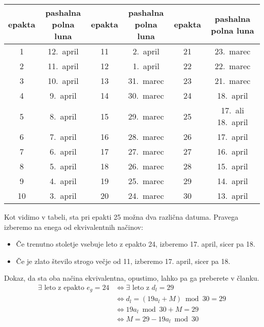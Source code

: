 \documentclass[a4paper,12pt]{article}
\begin{document}
\begin{center}
    \begin{tabular}{| c c | c c | c c |}
        \hline
        epakta & \makecell{pashalna \\ polna luna} & epakta & \makecell{pashalna \\ polna luna} & epakta & \makecell{pashalna \\ polna luna} \\ \hline
        1 & 12.\ april & 11 & 2.\ april & 21 & 23.\ marec \\  
        2 & 11.\ april & 12 & 1.\ april & 22 & 22.\ marec \\
        3 & 10.\ april & 13 & 31.\ marec & 23 & 21.\ marec \\
        4 & 9.\ april & 14 & 30.\ marec & 24 & 18.\ april \\
        5 & 8.\ april & 15 & 29.\ marec & 25 & 17.\ ali 18.\ april \\
        6 & 7.\ april & 16 & 28.\ marec & 26 & 17.\ april \\
        7 & 6.\ april & 17 & 27.\ marec & 27 & 16.\ april \\
        8 & 5.\ april & 18 & 26.\ marec & 28 & 15.\ april \\
        9 & 4.\ april & 19 & 25.\ marec & 29 & 14.\ april \\
        10 & 3.\ april & 20 & 24.\ marec & 30 & 13.\ april \\ \hline
    \end{tabular}
\end{center} %

Kot vidimo v tabeli, sta pri epakti 25 možna dva različna datuma. 
Pravega izberemo na enega od ekvivalentnih načinov:
\begin{itemize}
    \item Če trenutno stoletje vsebuje leto z epakto 24, izberemo 17. april, 
        sicer pa 18.
    \item Če je zlato število strogo večje od 11, izberemo 17. april, sicer 
        pa 18.
\end{itemize}

Dokaz, da sta oba načina ekvivalentna, opustimo, lahko pa ga preberete v članku.
\begin{align*}
    \exists \text{ leto z epakto } e_g = 24 &\Leftrightarrow \exists \text{ leto z } d_l = 29 \\
    &\Leftrightarrow d_l = (19 a_l + M) \bmod 30 = 29 \\
    &\Leftrightarrow 19 a_l \bmod 30 + M = 29 \\
    &\Leftrightarrow M = 29 - 19 a_l \bmod 30
\end{align*}
\end{document}
